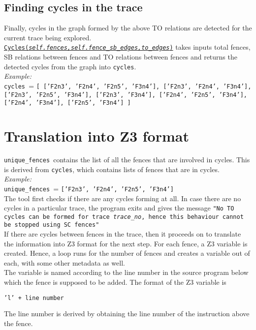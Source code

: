 \documentclass{article}
\newcommand{\var}[1]{\color{OliveGreen} \texttt{#1}\color{black}}
\newcommand{\fun}[2]{\color{Sepia}\texttt{#1(\color{Gray}\textit{#2}\color{Sepia})}\color{black}}
\newcommand{\varinfo}[1]{\scriptsize \texttt{#1} \normalsize}
\begin{document}
\subsection{Finding cycles in the trace}
Finally, cycles in the graph formed by the above TO relations are detected for the current trace being explored.\\
\href{cycle.tex}{\fun{Cycles}{self.fences,self.fence\_sb\_edges,to\_edges}} takes inputs total fences, SB relations between fences and TO relations between fences and returns the detected cycles from the graph into \var{cycles}.\\
\textit{Example:}\\
\var{cycles }= \varinfo{[ ['F2n3', 'F2n4', 'F2n5', 'F3n4'],
['F2n3', 'F2n4', 'F3n4'],
['F2n3', 'F2n5', 'F3n4'],
['F2n3', 'F3n4'],
['F2n4', 'F2n5', 'F3n4'],
['F2n4', 'F3n4'],
['F2n5', 'F3n4']
]}

\section{Translation into Z3 format}
\var{unique\_fences }contains the list of all the fences that are involved in cycles. This is derived from \var{cycles}, which contains lists of fences that are in cycles.\\
\textit{Example:}\\
\var{unique\_fences }= \varinfo{['F2n3', 'F2n4', 'F2n5', 'F3n4']}\\

The tool first checks if there are any cycles forming at all. In case there are no cycles in a particular trace, the program exits and gives the message \small \texttt{"No TO cycles can be formed for trace \textit{trace\_no}, hence this behaviour cannot be stopped using SC fences"}\\

If there are cycles between fences in the trace, then it proceeds on to translate the information into Z3 format for the next step. For each fence, a Z3 variable is created. Hence, a loop runs for the number of fences and creates a variable out of each, with some other metadata as well.\\

The variable is named according to the line number in the source program below which the fence is supposed to be added. The format of the Z3 variable is \begin{center}
    \texttt{'l' + line number}
\end{center}
The line number is derived by obtaining the line number of the instruction above the fence.\\
\end{document}
